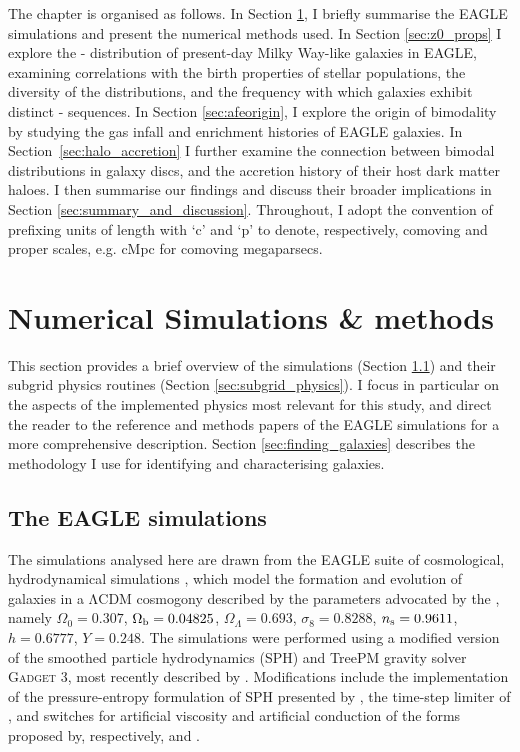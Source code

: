 The chapter is organised as follows. In Section \ref{sec:methods}, I briefly summarise the EAGLE simulations and present the numerical methods used. In Section \ref{sec:z0_props} I explore the \afe{}-\feh{} distribution of present-day Milky Way-like galaxies in EAGLE, examining correlations with the birth properties of stellar populations, the diversity of the distributions, and the frequency with which galaxies exhibit distinct \afe{}-\feh{} sequences. In Section \ref{sec:afeorigin}, I explore the origin of \afe{} bimodality by studying the gas infall and enrichment histories of EAGLE galaxies. In Section~\ref{sec:halo_accretion} I further examine the connection between bimodal \afe{} distributions in galaxy discs, and the accretion history of their host dark matter haloes. I then summarise our findings and discuss their broader implications in Section \ref{sec:summary_and_discussion}. Throughout, I adopt the convention of prefixing units of length with `c' and `p' to denote, respectively, comoving and proper scales, e.g. cMpc for comoving megaparsecs. 

\section{Numerical Simulations \& methods}
\label{sec:methods}

This section provides a brief overview of the simulations (Section \ref{sec:eagle}) and their subgrid physics routines (Section \ref{sec:subgrid_physics}). I focus in particular on the aspects of the implemented physics most relevant for this study, and direct the reader to the reference and methods papers of the EAGLE simulations for a more comprehensive description. Section \ref{sec:finding_galaxies} describes the methodology I use for identifying and characterising galaxies. 

\subsection{The EAGLE simulations}
\label{sec:eagle}

The simulations analysed here are drawn from the EAGLE suite of cosmological, hydrodynamical simulations \citep{2015MNRAS.446..521S,2015MNRAS.450.1937C}, which model the formation and evolution of galaxies in a $\mathrm{\Lambda CDM}$ cosmogony described by the parameters advocated by the \citet{2014A&A...571A...1P}, namely {$\Omega_0 = 0.307$, $\Omega_{\rm b} = 0.04825$, $\Omega_\Lambda= 0.693$, $\sigma_8 = 0.8288$, $n_{\rm s} = 0.9611$, $h = 0.6777$, $Y = 0.248$}. The simulations were performed using a modified version of the smoothed particle hydrodynamics (SPH) and TreePM gravity solver \textsc{Gadget 3}, most recently described by \citet{2005MNRAS.364.1105S}. Modifications include the implementation of the pressure-entropy formulation of SPH presented by \citet{2013MNRAS.428.2840H}, the time-step limiter of \citet{2012MNRAS.419..465D}, and switches for artificial viscosity and artificial conduction of the forms proposed by, respectively, \citet{2010MNRAS.408..669C} and \citet{2010MNRAS.401.1475P}.


